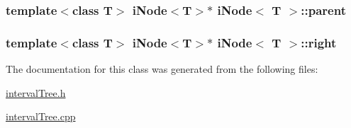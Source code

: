 \hypertarget{classi_node_a135b6475b43e4d1389cc620f57b2a6c8}{
\subsubsection[{parent}]{\setlength{\rightskip}{0pt plus 5cm}template$<$class T$>$ {\bf i\-Node}$<$T$>$$\ast$ {\bf i\-Node}$<$ T $>$\-::parent}}\label{classi_node_a135b6475b43e4d1389cc620f57b2a6c8}
\hypertarget{classi_node_a5a10f40c1df5dd9d5391b7ca02919597}{
\subsubsection[{right}]{\setlength{\rightskip}{0pt plus 5cm}template$<$class T$>$ {\bf i\-Node}$<$T$>$$\ast$ {\bf i\-Node}$<$ T $>$\-::right}}\label{classi_node_a5a10f40c1df5dd9d5391b7ca02919597}


The documentation for this class was generated from the following files\-:\begin{DoxyCompactItemize}
\item 
\hyperlink{interval_tree_8h}{interval\-Tree.\-h}\item 
\hyperlink{interval_tree_8cpp}{interval\-Tree.\-cpp}\end{DoxyCompactItemize}

